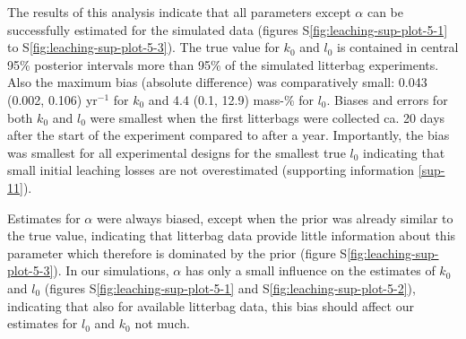 \documentclass[
  12pt,
]{article}
\begin{document}
The results of this analysis indicate that all parameters except \(\alpha\) can be successfully estimated for the simulated data (figures S\ref{fig:leaching-sup-plot-5-1} to S\ref{fig:leaching-sup-plot-5-3}). The true value for \(k_0\) and \(l_0\) is contained in central 95\% posterior intervals more than 95\% of the simulated litterbag experiments. Also the maximum bias (absolute difference) was comparatively small: 0.043 (0.002, 0.106) yr\(^{-1}\) for \(k_0\) and 4.4 (0.1, 12.9) mass-\% for \(l_0\). Biases and errors for both \(k_0\) and \(l_0\) were smallest when the first litterbags were collected ca. 20 days after the start of the experiment compared to after a year. Importantly, the bias was smallest for all experimental designs for the smallest true \(l_0\) indicating that small initial leaching losses are not overestimated (supporting information \ref{sup-11}).

Estimates for \(\alpha\) were always biased, except when the prior was already similar to the true value, indicating that litterbag data provide little information about this parameter which therefore is dominated by the prior (figure S\ref{fig:leaching-sup-plot-5-3}). In our simulations, \(\alpha\) has only a small influence on the estimates of \(k_0\) and \(l_0\) (figures S\ref{fig:leaching-sup-plot-5-1} and S\ref{fig:leaching-sup-plot-5-2}), indicating that also for available litterbag data, this bias should affect our estimates for \(l_0\) and \(k_0\) not much.
\end{document}
